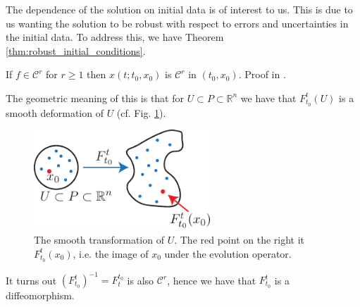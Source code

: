 The dependence of the solution on initial data is of interest to us. This is due to us wanting the solution to be robust with respect to errors and uncertainties in the initial data. To address this, we have Theorem \ref{thm:robust_initial_conditions}.
\begin{theorem}[]
	If $f \in \mathcal{C}^r$ for $r\geq 1$ then $ {x}(t; t_0,  {x}_0)$ is $\mathcal{C}^r$ in $(t_0,  {x}_0)$. Proof in \cite{Arnold}.
	\label{thm:robust_initial_conditions}
\end{theorem}

The geometric meaning of this is that for $U \subset P \subset \mathbb{R}^{n}$ we have that $F_{t_0}^{t}(U)$ is a smooth deformation of $U$ (cf. Fig. \ref{fig:deformation}).
\begin{figure}[h!]
	\centering
	\hspace{0.1\textwidth}
	\includegraphics[width=0.6\textwidth]{figures/ch1/7smooth_transform.pdf}
	\caption{The smooth transformation of $U$. The red point on the right it $F _{t_0}^t( {x}_0)$, i.e. the image of $ {x}_0$ under the evolution operator.}
	\label{fig:deformation}
\end{figure}
It turns out $\left(F_{t_0}^{t}\right)^{-1} = F_{t}^{t_0}$ is also $\mathcal{C}^r$, hence we have that $F_{t_0}^{t}$ is a diffeomorphism. 

